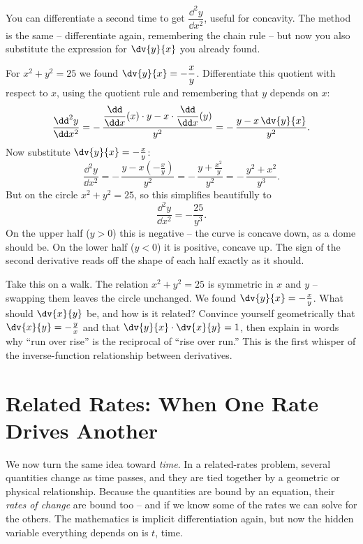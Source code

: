 You can differentiate a second time to get $\dfrac{\dd^2 y}{\dd x^2}$, useful for concavity. The
method is the same -- differentiate again, remembering the chain rule -- but now you also substitute
the expression for $\dv{y}{x}$ you already found.

\begin{example}
\label{ch13:ex-second}
For $x^2+y^2=25$ we found $\dv{y}{x} = -\dfrac{x}{y}$. Differentiate this quotient with respect to
$x$, using the quotient rule and remembering that $y$ depends on $x$:
\[
\frac{\dd^2 y}{\dd x^2}
= -\,\frac{\dfrac{\dd}{\dd x}(x)\cdot y - x\cdot\dfrac{\dd}{\dd x}(y)}{y^2}
= -\,\frac{y - x\,\dv{y}{x}}{y^2}.
\]
Now substitute $\dv{y}{x} = -\tfrac{x}{y}$:
\[
\frac{\dd^2 y}{\dd x^2}
= -\,\frac{y - x\left(-\tfrac{x}{y}\right)}{y^2}
= -\,\frac{y + \tfrac{x^2}{y}}{y^2}
= -\,\frac{y^2 + x^2}{y^3}.
\]
But on the circle $x^2 + y^2 = 25$, so this simplifies beautifully to
\[
\frac{\dd^2 y}{\dd x^2} = -\frac{25}{y^3}.
\]
On the upper half ($y>0$) this is negative -- the curve is concave down, as a dome should be. On the
lower half ($y<0$) it is positive, concave up. The sign of the second derivative reads off the shape
of each half exactly as it should.
\end{example}

\begin{walkbox}
Take this on a walk. The relation $x^2+y^2=25$ is symmetric in $x$ and $y$ -- swapping them leaves
the circle unchanged. We found $\dv{y}{x} = -\tfrac{x}{y}$. What should $\dv{x}{y}$ be, and how is it
related? Convince yourself geometrically that $\dv{x}{y} = -\tfrac{y}{x}$ and that
$\dv{y}{x}\cdot\dv{x}{y} = 1$, then explain in words why ``run over rise'' is the reciprocal of
``rise over run.'' This is the first whisper of the inverse-function relationship between derivatives.
\end{walkbox}

\section{Related Rates: When One Rate Drives Another}
\label{ch13:related-rates}

We now turn the same idea toward \emph{time}. In a related-rates problem, several quantities change
as time passes, and they are tied together by a geometric or physical relationship. Because the
quantities are bound by an equation, their \emph{rates of change} are bound too -- and if we know
some of the rates we can solve for the others. The mathematics is implicit differentiation again,
but now the hidden variable everything depends on is $t$, time.

